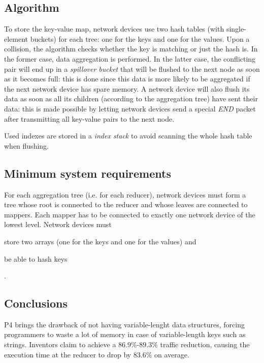 \subsection{Algorithm}
To store the key-value map, network devices use two hash tables (with single-element buckets) for each tree: one for the keys and one for the values.
Upon a collision, the algorithm checks whether the key is matching or just the hash is.
In the former case, data aggregation is performed. In the latter case, the conflicting pair will end up in a \textit{spillover bucket} that will be flushed to the next node as soon as it becomes full: this is done since this data is more likely to be aggregated if the next network device has spare memory.
A network device will also flush its data as soon as all its children (according to the aggregation tree) have sent their data: this is made possible by letting network devices send a special \textit{END} packet after transmitting all key-value pairs to the next node.\par
Used indexes are stored in a \textit{index stack} to avoid scanning the whole hash table when flushing.

\subsection{Minimum system requirements}
For each aggregation tree (i.e. for each reducer), network devices must form a tree whose root is connected to the reducer and whose leaves are connected to mappers.
Each mapper has to be connected to exactly one network device of the lowest level.
Network devices must
\begin{mylist}
    \item store two arrays (one for the keys and one for the values) and
    \item be able to hash keys
\end{mylist}.

\subsection{Conclusions}
P4 brings the drawback of not having variable-lenght data structures, forcing programmers to waste a lot of memory in case of variable-length keys such as strings.
Inventors claim to achieve a 86.9\%-89.3\% traffic reduction, causing the execution time at the reducer to drop by 83.6\% on average.